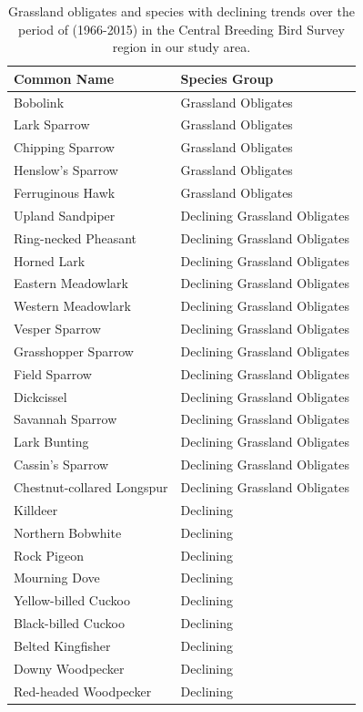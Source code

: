 \documentclass[print]{nuthesis}
\begin{document}
\begin{longtable}{ll}
\caption{\label{tab:sppIntTab}Grassland obligates and species with declining trends over the period of (1966-2015) in the Central Breeding Bird Survey region in our study area.}\\
\toprule
Common Name & Species Group\\
\midrule
Bobolink & Grassland Obligates\\
Lark Sparrow & Grassland Obligates\\
Chipping Sparrow & Grassland Obligates\\
Henslow's Sparrow & Grassland Obligates\\
Ferruginous Hawk & Grassland Obligates\\
\addlinespace
Upland Sandpiper & Declining Grassland Obligates\\
Ring-necked Pheasant & Declining Grassland Obligates\\
Horned Lark & Declining Grassland Obligates\\
Eastern Meadowlark & Declining Grassland Obligates\\
Western Meadowlark & Declining Grassland Obligates\\
\addlinespace
Vesper Sparrow & Declining Grassland Obligates\\
Grasshopper Sparrow & Declining Grassland Obligates\\
Field Sparrow & Declining Grassland Obligates\\
Dickcissel & Declining Grassland Obligates\\
Savannah Sparrow & Declining Grassland Obligates\\
\addlinespace
Lark Bunting & Declining Grassland Obligates\\
Cassin's Sparrow & Declining Grassland Obligates\\
Chestnut-collared Longspur & Declining Grassland Obligates\\
Killdeer & Declining\\
Northern Bobwhite & Declining\\
\addlinespace
Rock Pigeon & Declining\\
Mourning Dove & Declining\\
Yellow-billed Cuckoo & Declining\\
Black-billed Cuckoo & Declining\\
Belted Kingfisher & Declining\\
\addlinespace
Downy Woodpecker & Declining\\
Red-headed Woodpecker & Declining\\

\end{longtable}
\end{document}
